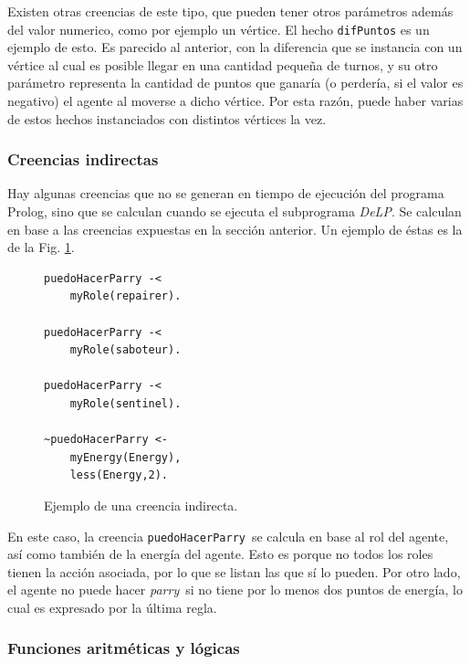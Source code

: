 \documentclass[oneside]{book}
\theoremstyle{definition}
\theoremstyle{example}
\begin{document}
Existen otras creencias de este tipo, que pueden tener otros parámetros además del valor
numerico, como por ejemplo un vértice. El hecho \texttt{difPuntos} es un ejemplo de esto.
Es parecido al anterior, con la diferencia que se instancia con un vértice al cual es
posible llegar en una cantidad pequeña de turnos, y su otro parámetro representa la
cantidad de puntos que ganaría (o perdería, si el valor es negativo) el agente al moverse
a dicho vértice. Por esta razón, puede haber varias de estos hechos instanciados con
distintos vértices la vez.

\subsubsection{Creencias indirectas}

\label{sec:creeciasIndirectas}

Hay algunas creencias que no se generan en tiempo de ejecución del programa Prolog, sino
que se calculan cuando se ejecuta el subprograma \textit{DeLP}. Se calculan en base a las creencias
expuestas en la sección anterior. Un ejemplo de éstas es la de la Fig. 
\ref{fig:creenciaIndirecta}.

\begin{figure}
\begin{verbatim}
puedoHacerParry -<
    myRole(repairer).

puedoHacerParry -<
    myRole(saboteur).

puedoHacerParry -<
    myRole(sentinel).

~puedoHacerParry <-
    myEnergy(Energy),
    less(Energy,2).
\end{verbatim}

\caption{Ejemplo de una creencia indirecta.}
\label{fig:creenciaIndirecta}

\end{figure}

En este caso, la creencia \texttt{puedoHacerParry}\ se calcula en base al rol del 
agente,
así como también de la energía del agente. Esto es porque no todos los roles tienen la
acción asociada, por lo que se listan las que sí lo pueden. Por otro lado, el agente
no puede hacer \textit{parry}\ si no tiene por lo menos dos puntos de energía, lo cual
es expresado por la última regla.

\subsubsection{Funciones aritméticas y lógicas}
\end{document}
